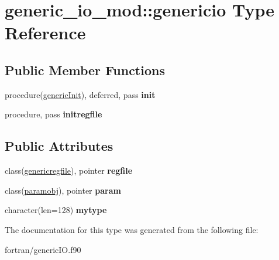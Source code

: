 \hypertarget{structgeneric__io__mod_1_1genericio}{}\section{generic\+\_\+io\+\_\+mod\+:\+:genericio Type Reference}
\label{structgeneric__io__mod_1_1genericio}
\subsection*{Public Member Functions}
\begin{DoxyCompactItemize}
\item 
\mbox{\label{structgeneric__io__mod_1_1genericio_af9e5904ad8a5c1c1ec71c8d93edfb87d}} 
procedure(\hyperlink{interfacegeneric__io__mod_1_1generic_init}{generic\+Init}), deferred, pass {\bfseries init}
\item 
\mbox{\label{structgeneric__io__mod_1_1genericio_aa0e6bab66a5b85a9789297febb840260}} 
procedure, pass {\bfseries initregfile}
\end{DoxyCompactItemize}
\subsection*{Public Attributes}
\begin{DoxyCompactItemize}
\item 
\mbox{\label{structgeneric__io__mod_1_1genericio_a0ce796094b2bf0774d476ba855300079}} 
class(\hyperlink{structgeneric__file__mod_1_1genericregfile}{genericregfile}), pointer {\bfseries regfile}
\item 
\mbox{\label{structgeneric__io__mod_1_1genericio_ad7facea96efad0781848d0284839fc5b}} 
class(\hyperlink{structparam__func__mod_1_1paramobj}{paramobj}), pointer {\bfseries param}
\item 
\mbox{\label{structgeneric__io__mod_1_1genericio_a78b1fd7c5dab3441e051dc33e56be3ec}} 
character(len=128) {\bfseries mytype}
\end{DoxyCompactItemize}


The documentation for this type was generated from the following file\+:\begin{DoxyCompactItemize}
\item 
fortran/generic\+I\+O.\+f90\end{DoxyCompactItemize}
